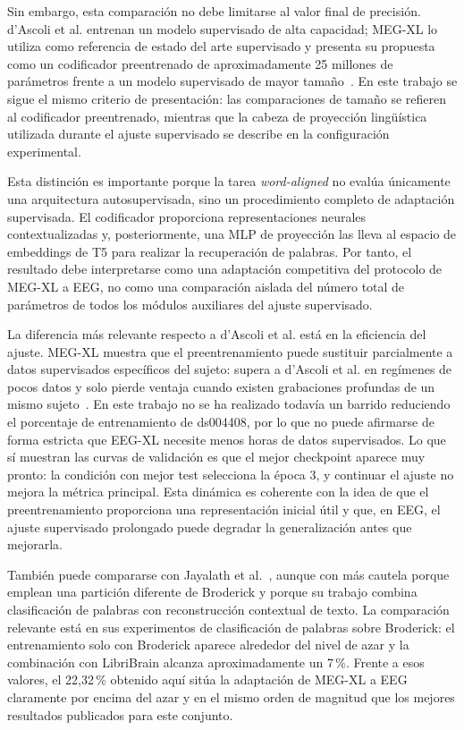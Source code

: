 Sin embargo, esta comparación no debe limitarse al valor final de precisión. d'Ascoli et al. entrenan un modelo supervisado de alta capacidad; MEG-XL lo utiliza como referencia de estado del arte supervisado y presenta su propuesta como un codificador preentrenado de aproximadamente 25 millones de parámetros frente a un modelo supervisado de mayor tamaño~\cite{jayalath2026megxl}. En este trabajo se sigue el mismo criterio de presentación: las comparaciones de tamaño se refieren al codificador preentrenado, mientras que la cabeza de proyección lingüística utilizada durante el ajuste supervisado se describe en la configuración experimental.

Esta distinción es importante porque la tarea \textit{word-aligned} no evalúa únicamente una arquitectura autosupervisada, sino un procedimiento completo de adaptación supervisada. El codificador proporciona representaciones neurales contextualizadas y, posteriormente, una MLP de proyección las lleva al espacio de embeddings de T5 para realizar la recuperación de palabras. Por tanto, el resultado debe interpretarse como una adaptación competitiva del protocolo de MEG-XL a EEG, no como una comparación aislada del número total de parámetros de todos los módulos auxiliares del ajuste supervisado.

La diferencia más relevante respecto a d'Ascoli et al. está en la eficiencia del ajuste. MEG-XL muestra que el preentrenamiento puede sustituir parcialmente a datos supervisados específicos del sujeto: supera a d'Ascoli et al. en regímenes de pocos datos y solo pierde ventaja cuando existen grabaciones profundas de un mismo sujeto~\cite{jayalath2026megxl}. En este trabajo no se ha realizado todavía un barrido reduciendo el porcentaje de entrenamiento de ds004408, por lo que no puede afirmarse de forma estricta que EEG-XL necesite menos horas de datos supervisados. Lo que sí muestran las curvas de validación es que el mejor checkpoint aparece muy pronto: la condición con mejor test selecciona la época 3, y continuar el ajuste no mejora la métrica principal. Esta dinámica es coherente con la idea de que el preentrenamiento proporciona una representación inicial útil y que, en EEG, el ajuste supervisado prolongado puede degradar la generalización antes que mejorarla.

También puede compararse con Jayalath et al.~\cite{jayalath2025unlocking}, aunque con más cautela porque emplean una partición diferente de Broderick y porque su trabajo combina clasificación de palabras con reconstrucción contextual de texto. La comparación relevante está en sus experimentos de clasificación de palabras sobre Broderick: el entrenamiento solo con Broderick aparece alrededor del nivel de azar y la combinación con LibriBrain alcanza aproximadamente un 7\,\%. Frente a esos valores, el 22,32\,\% obtenido aquí sitúa la adaptación de MEG-XL a EEG claramente por encima del azar y en el mismo orden de magnitud que los mejores resultados publicados para este conjunto.

